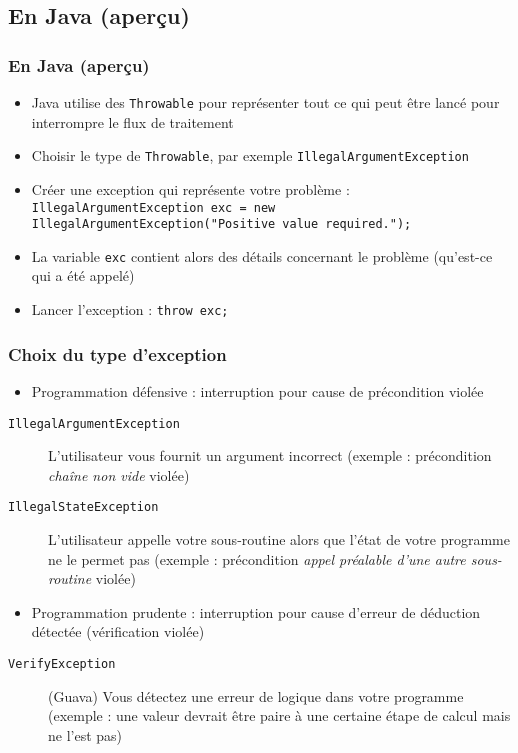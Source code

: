 \documentclass[english, french]{beamer}
\begin{document}
\subsection{En Java (aperçu)}
\begin{frame}
	\frametitle{En Java (aperçu)}
	\begin{itemize}
		\item Java utilise des \texttt{Throwable} pour représenter tout ce qui peut être lancé pour interrompre le flux de traitement
		\item Choisir le type de \texttt{Throwable}, par exemple \texttt{IllegalArgumentException}
		\item Créer une exception qui représente votre problème : \texttt{IllegalArgumentException exc = new IllegalArgumentException("Positive value required.");}
		\item La variable \texttt{exc} contient alors des détails concernant le problème (qu’est-ce qui a été appelé)
		\item Lancer l’exception : \texttt{throw exc;}
	\end{itemize}
\end{frame}

\begin{frame}
	\frametitle{Choix du type d’exception}
	\begin{itemize}
		\item Programmation défensive : interruption pour cause de précondition violée
	\end{itemize}
	\begin{description}%
		\item[\texttt{IllegalArgumentException}] L’utilisateur vous fournit un argument incorrect (exemple : précondition \emph{chaîne non vide} violée)
		\item[\texttt{IllegalStateException}] L’utilisateur appelle votre sous-routine alors que l’état de votre programme ne le permet pas (exemple : précondition \emph{appel préalable d’une autre sous-routine} violée)
	\end{description}
	\begin{itemize}
		\item Programmation prudente : interruption pour cause d’erreur de déduction détectée (vérification violée)
	\end{itemize}
	\begin{description}
		\item[\texttt{VerifyException}] (Guava) Vous détectez une erreur de logique dans votre programme (exemple : une valeur devrait être paire à une certaine étape de calcul mais ne l’est pas)
	\end{description}
\end{frame}
\end{document}
